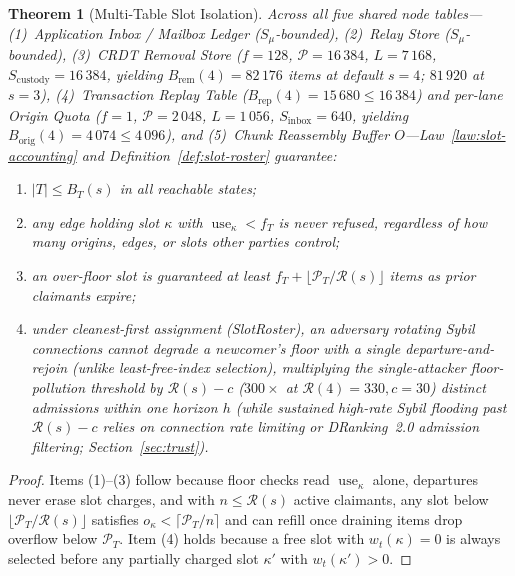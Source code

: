 \documentclass[journal]{IEEEtran}
\newtheorem{theorem}{Theorem}
\DeclareRobustCommand{\code}[1]{{\ttfamily\renewcommand{\_}{\textunderscore\allowbreak}#1}}
\begin{document}
\begin{theorem}[Multi-Table Slot Isolation]\label{theo:slot-isolation}
Across all five shared node tables---(1)~Application Inbox / Mailbox Ledger ($S_\mu$-bounded),
(2)~Relay Store ($S_\mu$-bounded), (3)~CRDT Removal Store ($f=128$, $\mathcal{P}=16\,384$, $L=7\,168$, $S_{\mathrm{custody}}=16\,384$, yielding $B_{\mathrm{rem}}(4)=82\,176$ items at default $s=4$; $81\,920$ at $s=3$), (4)~Transaction Replay Table ($B_{\mathrm{rep}}(4)=15\,680\le 16\,384$) and per-lane Origin Quota ($f=1$, $\mathcal{P}=2\,048$, $L=1\,056$, $S_{\mathrm{inbox}}=640$, yielding $B_{\mathrm{orig}}(4)=4\,074\le 4\,096$), and
(5)~Chunk Reassembly Buffer $O$---Law~\ref{law:slot-accounting} and
Definition~\ref{def:slot-roster} guarantee:
\begin{enumerate}[leftmargin=1.5em]
\item $|T|\le B_T(s)$ in all reachable states;
\item any edge holding slot $\kappa$ with $\operatorname{use}_\kappa<f_T$ is
never refused, regardless of how many origins, edges, or slots other parties
control;
\item an over-floor slot is guaranteed at least
$f_T+\lfloor\mathcal{P}_T/\mathcal{R}(s)\rfloor$ items as prior claimants expire;
\item under cleanest-first assignment (\code{SlotRoster}), an adversary rotating
Sybil connections cannot degrade a newcomer's floor with a single departure-and-rejoin
(unlike least-free-index selection), multiplying the single-attacker floor-pollution
threshold by $\mathcal{R}(s)-c$ ($300\times$ at $\mathcal{R}(4)=330, c=30$) distinct
admissions within one horizon $h$ (while sustained high-rate Sybil flooding past $\mathcal{R}(s)-c$ relies on connection rate limiting or DRanking~2.0 admission filtering; Section~\ref{sec:trust}).
\end{enumerate}
\end{theorem}
\begin{proof}
Items (1)--(3) follow because floor checks read $\operatorname{use}_\kappa$
alone, departures never erase slot charges, and with $n\le\mathcal{R}(s)$ active
claimants, any slot below $\lfloor\mathcal{P}_T/\mathcal{R}(s)\rfloor$ satisfies
$o_\kappa<\lceil\mathcal{P}_T/n\rceil$ and can refill once draining items drop
overflow below $\mathcal{P}_T$.  Item (4)
holds because a free slot with $w_t(\kappa)=0$ is always selected before any
partially charged slot $\kappa'$ with $w_t(\kappa')>0$.
\end{proof}
\end{document}
